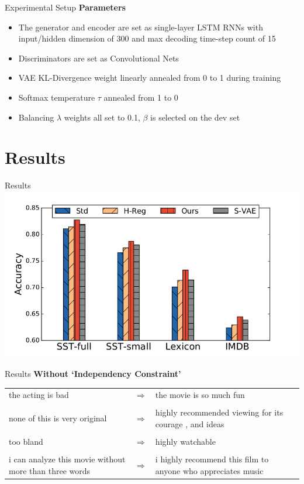 \documentclass{beamer}
\begin{document}
\begin{frame}{Experimental Setup}
	\textbf{Parameters}
	\begin{itemize}
		\item The generator and encoder are set as single-layer LSTM RNNs with input/hidden dimension of 300 and max decoding time-step count of 15
		\item Discriminators are set as Convolutional Nets
		\item VAE KL-Divergence weight linearly annealed from 0 to 1 during training
		\item Softmax temperature $\tau$ annealed from 1 to 0
		\item Balancing $\lambda$ weights all set to 0.1, $\beta$ is selected on the dev set
	\end{itemize}
\end{frame}

\section{Results}
\begin{frame}{Results}
	\centering
	\includegraphics[width=\textwidth]{images/senti.png}
\end{frame}

\begin{frame}{Results}
	\centering
	{\large \textbf{Without `Independency Constraint'}} \\
	\vspace{1cm}
	\small
	\begin{tabular}{ p{.4\linewidth} p{.05\linewidth} p{.4\linewidth} }
		the acting is bad                                      & $\Rightarrow$ & the movie is so much fun                                     \\ \\
		none of this is very original                          & $\Rightarrow$ & highly recommended viewing for its courage , and ideas       \\ \\
		too bland                                              & $\Rightarrow$ & highly watchable                                             \\ \\
		i can analyze this movie without more than three words & $\Rightarrow$ & i highly recommend this film to anyone who appreciates music
	\end{tabular}
\end{frame}
\end{document}
